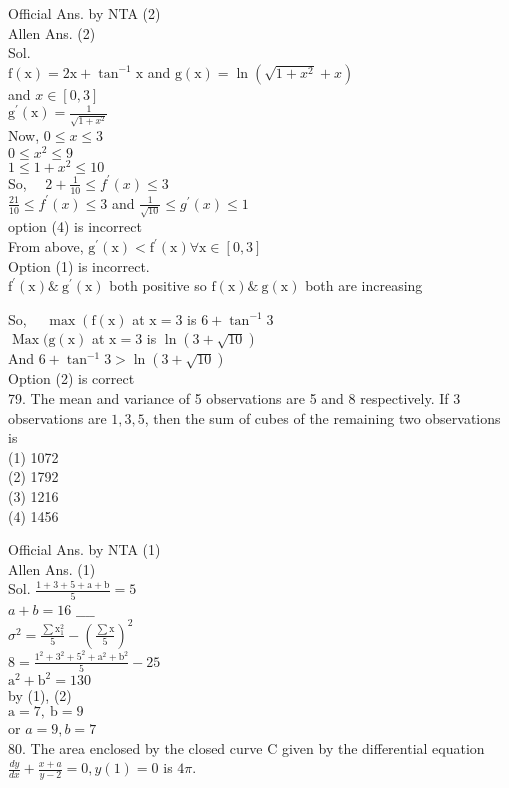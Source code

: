 \documentclass[10pt]{article}
\begin{document}
Official Ans. by NTA (2)\\
Allen Ans. (2)\\
Sol.\\
\(\mathrm{f}(\mathrm{x})=2 \mathrm{x}+\tan ^{-1} \mathrm{x}\) and \(\mathrm{g}(\mathrm{x})=\ln \left(\sqrt{1+x^{2}}+x\right)\)\\
and \(x \in[0,3]\)\\
\(\mathrm{g}^{\prime}(\mathrm{x})=\frac{1}{\sqrt{1+x^{2}}}\)\\
Now, \(0 \leq x \leq 3\)\\
\(0 \leq x^{2} \leq 9\)\\
\(1 \leq 1+x^{2} \leq 10\)\\
So, \(\quad 2+\frac{1}{10} \leq f^{\prime}(x) \leq 3\)\\
\(\frac{21}{10} \leq f^{\prime}(x) \leq 3\) and \(\frac{1}{\sqrt{10}} \leq g^{\prime}(x) \leq 1\)\\
option (4) is incorrect\\
From above, \(\mathrm{g}^{\prime}(\mathrm{x})<\mathrm{f}^{\prime}(\mathrm{x}) \forall \mathrm{x} \in[0,3]\)\\
Option (1) is incorrect.\\
\(\mathrm{f}^{\prime}(\mathrm{x}) \& \mathrm{~g}^{\prime}(\mathrm{x})\) both positive so \(\mathrm{f}(\mathrm{x}) \& \mathrm{~g}(\mathrm{x})\) both are increasing

So, \(\quad \max \left(\mathrm{f}(\mathrm{x})\right.\) at \(\mathrm{x}=3\) is \(6+\tan ^{-1} 3\)\\
\(\operatorname{Max}(\mathrm{g}(\mathrm{x})\) at \(\mathrm{x}=3\) is \(\ln (3+\sqrt{10})\)\\
And \(6+\tan ^{-1} 3>\ln (3+\sqrt{10})\)\\
Option (2) is correct\\
79. The mean and variance of 5 observations are 5 and 8 respectively. If 3 observations are \(1,3,5\), then the sum of cubes of the remaining two observations is\\
(1) 1072\\
(2) 1792\\
(3) 1216\\
(4) 1456

Official Ans. by NTA (1)\\
Allen Ans. (1)\\
Sol. \(\frac{1+3+5+\mathrm{a}+\mathrm{b}}{5}=5\)\\
\(a+b=16\) \(\_\_\_\_\)\\
\(\sigma^{2}=\frac{\sum \mathrm{x}_{1}^{2}}{5}-\left(\frac{\sum \mathrm{x}}{5}\right)^{2}\)\\
\(8=\frac{1^{2}+3^{2}+5^{2}+\mathrm{a}^{2}+\mathrm{b}^{2}}{5}-25\)\\
\(\mathrm{a}^{2}+\mathrm{b}^{2}=130\)\\
by (1), (2)\\
\(\mathrm{a}=7, \mathrm{~b}=9\)\\
or \(a=9, b=7\)\\
80. The area enclosed by the closed curve C given by the differential equation \(\frac{d y}{d x}+\frac{x+a}{y-2}=0, y(1)=0\) is \(4 \pi\).
\end{document}
